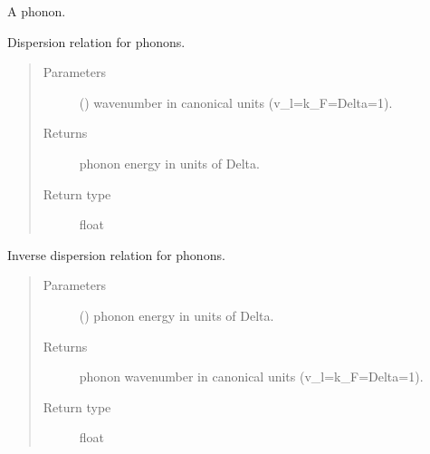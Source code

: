 \documentclass[letterpaper,10pt,english]{sphinxmanual}
\begin{document}

\begin{fulllineitems}
\label{\detokenize{code_structure:scdc.particle.Phonon}}
A phonon.

\begin{fulllineitems}
\label{\detokenize{code_structure:scdc.particle.Phonon.dispersion}}
Dispersion relation for phonons.
\begin{quote}\begin{description}
\item[{Parameters}] \leavevmode
{} () \textendash{} wavenumber in canonical units (v\_l=k\_F=Delta=1).

\item[{Returns}] \leavevmode
phonon energy in units of Delta.

\item[{Return type}] \leavevmode
float

\end{description}\end{quote}

\end{fulllineitems}


\begin{fulllineitems}
\label{\detokenize{code_structure:scdc.particle.Phonon.dispersion_inverse}}
Inverse dispersion relation for phonons.
\begin{quote}\begin{description}
\item[{Parameters}] \leavevmode
{} () \textendash{} phonon energy in units of Delta.

\item[{Returns}] \leavevmode
phonon wavenumber in canonical units (v\_l=k\_F=Delta=1).

\item[{Return type}] \leavevmode
float

\end{description}\end{quote}

\end{fulllineitems}


\end{fulllineitems}
\end{document}
